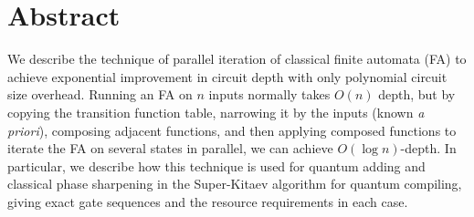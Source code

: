 \section{Abstract}

We describe the technique of parallel iteration of classical finite
automata (FA) to achieve exponential improvement in circuit depth with
only polynomial circuit size overhead. Running an FA on $n$ inputs
normally takes $O(n)$ depth, but by copying the transition function
table, narrowing it by the inputs (known \emph{a priori}), composing
adjacent functions, and then applying composed functions to iterate
the FA on several states in parallel, we can achieve $O(\log n)$-depth.
In particular, we describe how this technique is used for quantum
adding and classical phase sharpening in the Super-Kitaev algorithm
for quantum compiling, giving exact gate sequences and the resource
requirements in each case.
